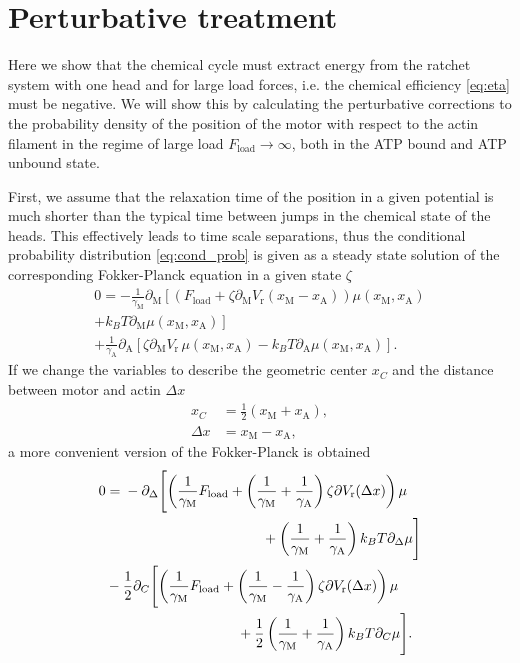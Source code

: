 \documentclass[aps,pre,twocolumn,showpacs,showkeys,superscriptaddress,floatfix]{revtex4-1}
\begin{document}
\section{Perturbative treatment}
\label{sec:perturb}
Here we show that the chemical cycle must extract energy from the ratchet system with one head and for large load forces, 
i.e. the chemical efficiency \eqref{eq:eta} must be negative. 
We will show this by calculating the perturbative corrections to the probability density of the position of the motor with respect to the actin filament in the regime of large load $F_\text{load} \to \infty$, both in the ATP bound and ATP unbound state. 

First, we assume that the relaxation time of the position in a given potential is much shorter than the typical time between jumps in the chemical state of the heads. 
This effectively leads to time scale separations,
thus the conditional probability distribution \eqref{eq:cond_prob} is given as a steady state solution of the corresponding Fokker-Planck equation in a given state $\zeta$
\begin{multline*}
0 = - \frac{1}{\gamma_\text{M}} \partial_\text{M} \left[ \left( F_\text{load} + \zeta \partial_\text{M} V_\text{r}( x_\text{M} - x_\text{A} ) \right) \mu\left( x_\text{M}, x_\text{A} \right)
\right. \\ \left.
+ k_B T \partial_\text{M} \mu\left( x_\text{M}, x_\text{A} \right) \right] 
\\
+ \frac{1}{\gamma_\text{A}} \partial_\text{A} \left[ 
\zeta \partial_\text{M} V_\text{r} \, \mu( x_\text{M}, x_\text{A} ) 
- k_B T \partial_\text{A} \mu\left( x_\text{M}, x_\text{A} \right) 
\right] .
\end{multline*}
If we change the variables to describe the geometric center $x_C$ and the distance between motor and actin $\Delta x$
\begin{align*}
x_C &= \frac{1}{2} ( x_\text{M} + x_\text{A} ) , \\
\Delta x &= x_\text{M} - x_\text{A}, 
\end{align*}
a more convenient version of the Fokker-Planck is obtained
\begin{align*}
0 &= \begin{multlined}[t][.4\textwidth]
- \partial_\Delta \Biggl[ 
\left( \frac{1}{\gamma_\text{M}} F_\text{load} + \left( \frac{1}{\gamma_\text{M}} + \frac{1}{\gamma_\text{A}} \right) \zeta \partial V_\text{r}( \Delta x ) \right) \mu
\\ 
+ \left( \frac{1}{\gamma_\text{M}} + \frac{1}{\gamma_\text{A}} \right) k_B T \partial_\Delta \mu 
\Biggr] 
\end{multlined}
\\
&- \begin{multlined}[t][.4\textwidth]
\frac{1}{2} \partial_C \Biggl[
\left( \frac{1}{\gamma_\text{M}} F_\text{load} + \left( \frac{1}{\gamma_\text{M}} - \frac{1}{\gamma_\text{A}} \right) \zeta \partial V_\text{r}( \Delta x ) \right) \mu
\\
+ \frac{1}{2} \left( \frac{1}{\gamma_\text{M}} + \frac{1}{\gamma_\text{A}} \right) k_B T \partial_C \mu 
\Biggr] .
\end{multlined}
\end{align*}
\end{document}
